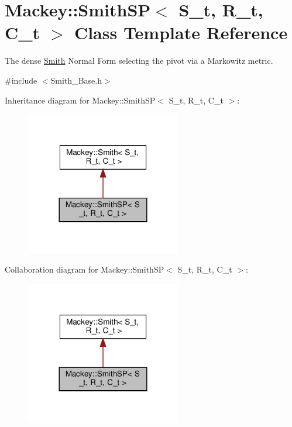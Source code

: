 \hypertarget{classMackey_1_1SmithSP}{}\section{Mackey\+:\+:Smith\+SP$<$ S\+\_\+t, R\+\_\+t, C\+\_\+t $>$ Class Template Reference}
\label{classMackey_1_1SmithSP}


The dense \hyperlink{classMackey_1_1Smith}{Smith} Normal Form selecting the pivot via a Markowitz metric.  




{\ttfamily \#include $<$Smith\+\_\+\+Base.\+h$>$}



Inheritance diagram for Mackey\+:\+:Smith\+SP$<$ S\+\_\+t, R\+\_\+t, C\+\_\+t $>$\+:\nopagebreak
\begin{figure}[H]
\begin{center}
\leavevmode
\includegraphics[width=192pt]{classMackey_1_1SmithSP__inherit__graph}
\end{center}
\end{figure}


Collaboration diagram for Mackey\+:\+:Smith\+SP$<$ S\+\_\+t, R\+\_\+t, C\+\_\+t $>$\+:\nopagebreak
\begin{figure}[H]
\begin{center}
\leavevmode
\includegraphics[width=192pt]{classMackey_1_1SmithSP__coll__graph}
\end{center}
\end{figure}
